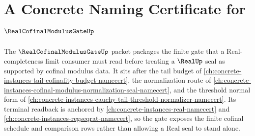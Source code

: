 \chapter{A Concrete Naming Certificate for $\RealCofinalModulusGateUp$}
\label{ch:concrete-instances-real-cofinal-modulus-gate-namecert}

The $\RealCofinalModulusGateUp$ packet packages the finite gate that a Real-completeness limit consumer must read before treating a $\RealUp$ seal as supported by cofinal modulus data. It sits after the tail budget of \autoref{ch:concrete-instances-tail-cofinality-budget-namecert}, the normalization route of \autoref{ch:concrete-instances-cofinal-modulus-normalization-seal-namecert}, and the threshold normal form of \autoref{ch:concrete-instances-cauchy-tail-threshold-normalizer-namecert}. Its terminal readback is anchored by \autoref{ch:concrete-instances-real-namecert} and \autoref{ch:concrete-instances-regseqrat-namecert}, so the gate exposes the finite cofinal schedule and comparison rows rather than allowing a Real seal to stand alone.

